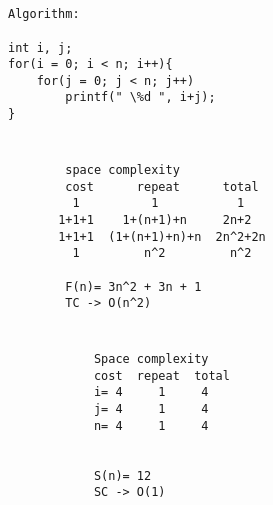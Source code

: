 \documentclass{article}
\begin{document}
\hrulefill
\begin{multicols}{3}
    \begin{minipage}{\linewidth}
        \section*{}
        \begin{verbatim}
Algorithm:

int i, j;
for(i = 0; i < n; i++){
    for(j = 0; j < n; j++)
        printf(" \%d ", i+j);
}
        \end{verbatim}
    \end{minipage}
    
    \begin{minipage}{\linewidth}
        \section*{}
        \begin{verbatim}
        space complexity
        cost      repeat      total
         1          1           1
       1+1+1    1+(n+1)+n     2n+2
       1+1+1  (1+(n+1)+n)+n  2n^2+2n
         1         n^2         n^2

        F(n)= 3n^2 + 3n + 1
        TC -> O(n^2)
        \end{verbatim}
    \end{minipage}

    
    \begin{minipage}{\linewidth}
        \section*{}
        \begin{verbatim}
            Space complexity
            cost  repeat  total
            i= 4     1     4
            j= 4     1     4
            n= 4     1     4
            

            S(n)= 12
            SC -> O(1)
        \end{verbatim}
    \end{minipage}
\end{multicols}
\end{document}
